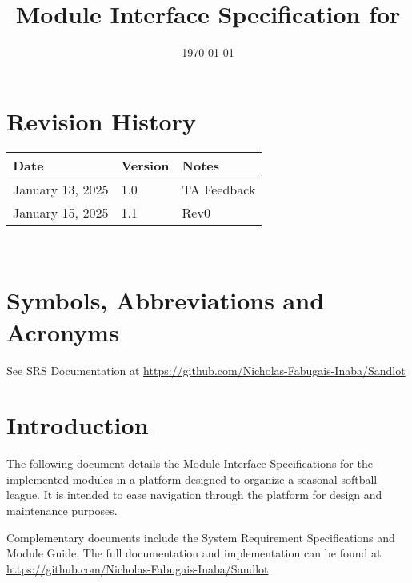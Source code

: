 \documentclass[12pt, titlepage]{article}
\begin{document}
\title{Module Interface Specification for \progname{}}

\author{\authname}

\date{\today}

\maketitle


\section{Revision History}

\begin{tabularx}{\textwidth}{p{3cm}p{2cm}X}
\toprule {\bf Date} & {\bf Version} & {\bf Notes}\\
\midrule
January 13, 2025 & 1.0 & TA Feedback\\
January 15, 2025 & 1.1 & Rev0\\
\bottomrule
\end{tabularx}

~\newpage

\section{Symbols, Abbreviations and Acronyms}

See SRS Documentation at \url{https://github.com/Nicholas-Fabugais-Inaba/Sandlot}


\newpage

\tableofcontents

\newpage


\section{Introduction}

The following document details the Module Interface Specifications for
the implemented modules in a platform designed to organize a seasonal
softball league. It is intended to ease navigation through the platform
for design and maintenance purposes.

Complementary documents include the System Requirement Specifications
and Module Guide.  The full documentation and implementation can be
found at \url{https://github.com/Nicholas-Fabugais-Inaba/Sandlot}.  
\end{document}
